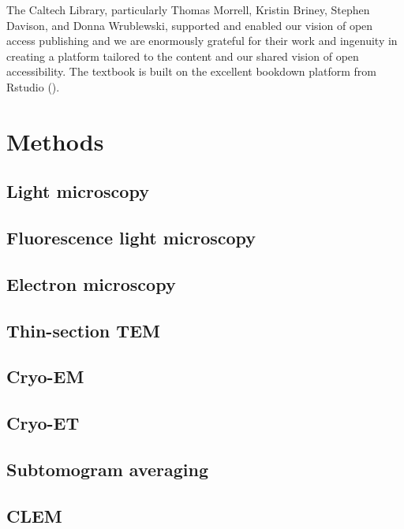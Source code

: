 \documentclass[]{tufte-book}
\begin{document}
The Caltech Library, particularly Thomas Morrell, Kristin Briney,
Stephen Davison, and Donna Wrublewski, supported and enabled our vision
of open access publishing and we are enormously grateful for their work
and ingenuity in creating a platform tailored to the content and our
shared vision of open accessibility. The textbook is built on the
excellent bookdown platform from Rstudio (\citet{xie2015}).

\chapter{Methods}\label{methods}

\section{Light microscopy}\label{light-microscopy}

\section{Fluorescence light
microscopy}\label{fluorescence-light-microscopy}

\section{Electron microscopy}\label{electron-microscopy}

\section{Thin-section TEM}\label{thin-section-tem}

\section{Cryo-EM}\label{cryo-em}

\section{Cryo-ET}\label{cryo-et}

\section{Subtomogram averaging}\label{subtomogram-averaging}

\section{CLEM}\label{clem}
\end{document}
